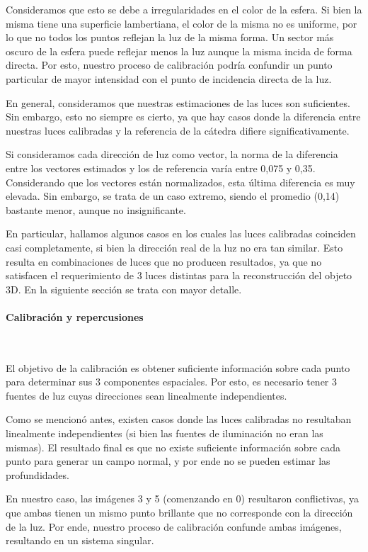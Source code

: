 Consideramos que esto se debe a irregularidades en el color de la esfera. Si bien la misma
tiene una superficie lambertiana, el color de la misma no es uniforme, por lo que no
todos los puntos reflejan la luz de la misma forma. Un sector más oscuro de la esfera
puede reflejar menos la luz aunque la misma incida de forma directa. Por esto, nuestro proceso
de calibración podría confundir un punto particular de mayor intensidad con el punto de
incidencia directa de la luz.

En general, consideramos que nuestras estimaciones de las luces son suficientes.
Sin embargo, esto no siempre es cierto, ya que hay casos donde la diferencia
entre nuestras luces calibradas y la referencia de la cátedra difiere significativamente.

Si consideramos cada dirección de luz como vector, la norma de la diferencia
entre los vectores estimados y los de referencia varía entre 0,075 y 0,35.
Considerando que los vectores están normalizados, esta última diferencia es muy elevada.
Sin embargo, se trata de un caso extremo, siendo el promedio (0,14)
bastante menor, aunque no insignificante.

En particular, hallamos algunos casos en los cuales las luces calibradas coinciden casi
completamente, si bien la dirección real de la luz no era tan similar. Esto resulta en
combinaciones de luces que no producen resultados, ya que no satisfacen el
requerimiento de 3 luces distintas para la reconstrucción del objeto 3D.
En la siguiente sección se trata con mayor detalle.

\paragraph{Calibración y repercusiones}
\

El objetivo de la calibración es obtener suficiente información sobre cada punto
para determinar sus 3 componentes espaciales. Por esto, es necesario tener 3
fuentes de luz cuyas direcciones sean linealmente independientes.

Como se mencionó antes, existen casos donde las luces calibradas no resultaban
linealmente independientes (si bien las fuentes de iluminación no eran las mismas).
El resultado final es que no existe suficiente información sobre cada punto
para generar un campo normal, y por ende no se pueden estimar las profundidades.

En nuestro caso, las imágenes 3 y 5 (comenzando en 0) resultaron conflictivas,
ya que ambas tienen un mismo punto brillante que no corresponde con la dirección
de la luz. Por ende, nuestro proceso de calibración confunde ambas imágenes,
resultando en un sistema singular.

